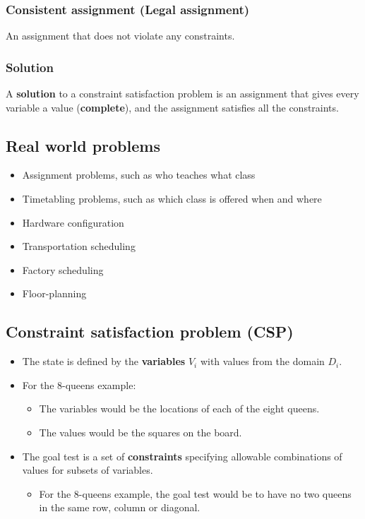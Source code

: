 \documentclass[11pt]{article}
\begin{document}
\subsubsection{Consistent assignment (Legal assignment)}
\label{sec:orgbac6981}
An assignment that does not violate any constraints.
\subsubsection{Solution}
\label{sec:org0ebabcd}
A \textbf{solution} to a constraint satisfaction problem is an assignment that gives every variable a value (\textbf{complete}), and the assignment satisfies all the constraints.
\subsection{Real world problems}
\label{sec:org7771e35}
\begin{itemize}
\item Assignment problems, such as who teaches what class
\item Timetabling problems, such as which class is offered when and where
\item Hardware configuration
\item Transportation scheduling
\item Factory scheduling
\item Floor-planning
\end{itemize}
\subsection{Constraint satisfaction problem (CSP)}
\label{sec:org21ae780}
\begin{itemize}
\item The state is defined by the \textbf{variables} \(V_i\) with values from the domain \(D_i\).
\item For the 8-queens example:
\begin{itemize}
\item The variables would be the locations of each of the eight queens.
\item The values would be the squares on the board.
\end{itemize}
\item The goal test is a set of \textbf{constraints} specifying allowable combinations of values for subsets of variables.
\begin{itemize}
\item For the 8-queens example, the goal test would be to have no two queens in the same row, column or diagonal.
\end{itemize}
\end{itemize}
\end{document}
